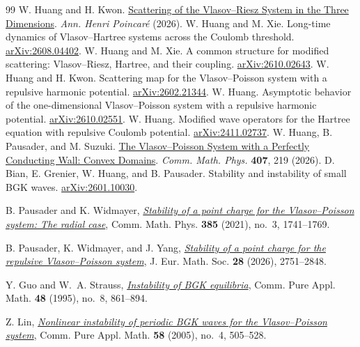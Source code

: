 \documentclass[reqno,10pt,a4paper]{amsart}
\numberwithin{equation}{section}
\begin{document}
\begin{thebibliography}{99}
\setlength{\itemsep}{1pt}\setlength{\parskip}{0pt}\setlength{\parsep}{0pt}
 W. Huang and H. Kwon. \href{https://doi.org/10.1007/s00023-026-01735-7}{Scattering of the Vlasov--Riesz System in the Three Dimensions}. \emph{Ann. Henri Poincar\'e} (2026).
 W. Huang and M. Xie. Long-time dynamics of Vlasov--Hartree systems across the Coulomb threshold. \href{https://arxiv.org/abs/2608.04402}{arXiv:2608.04402}.
 W. Huang and M. Xie. A common structure for modified scattering: Vlasov--Riesz, Hartree, and their coupling. \href{https://arxiv.org/abs/2610.02643}{arXiv:2610.02643}.
 W. Huang and H. Kwon. Scattering map for the Vlasov--Poisson system with a repulsive harmonic potential. \href{https://arxiv.org/abs/2602.21344}{arXiv:2602.21344}.
 W. Huang. Asymptotic behavior of the one-dimensional Vlasov--Poisson system with a repulsive harmonic potential. \href{https://arxiv.org/abs/2610.02551}{arXiv:2610.02551}.
 W. Huang. Modified wave operators for the Hartree equation with repulsive Coulomb potential. \href{https://arxiv.org/abs/2411.02737}{arXiv:2411.02737}.
 W. Huang, B. Pausader, and M. Suzuki. \href{https://doi.org/10.1007/s00220-026-05731-0}{The Vlasov--Poisson System with a Perfectly Conducting Wall: Convex Domains}. \emph{Comm. Math. Phys.} \textbf{407}, 219 (2026).
 D. Bian, E. Grenier, W. Huang, and B. Pausader. Stability and instability of small BGK waves. \href{https://arxiv.org/abs/2601.10030}{arXiv:2601.10030}.

 B. Pausader and K. Widmayer,
\href{https://link.springer.com/article/10.1007/s00220-021-04117-8}{\emph{Stability of a point charge for the Vlasov--Poisson system: The radial case}},
Comm. Math. Phys. \textbf{385} (2021), no.~3, 1741--1769.

 B. Pausader, K. Widmayer, and J. Yang,
\href{https://doi.org/10.4171/JEMS/1518}{\emph{Stability of a point charge for the repulsive Vlasov--Poisson system}},
J. Eur. Math. Soc. \textbf{28} (2026), 2751--2848.

 Y. Guo and W.~A. Strauss,
\href{https://onlinelibrary.wiley.com/doi/abs/10.1002/cpa.3160480803}{\emph{Instability of BGK equilibria}},
Comm. Pure Appl. Math. \textbf{48} (1995), no.~8, 861--894.

 Z. Lin,
\href{https://onlinelibrary.wiley.com/doi/abs/10.1002/cpa.20028}{\emph{Nonlinear instability of periodic BGK waves for the Vlasov--Poisson system}},
Comm. Pure Appl. Math. \textbf{58} (2005), no.~4, 505--528.
\end{thebibliography}
\end{document}

